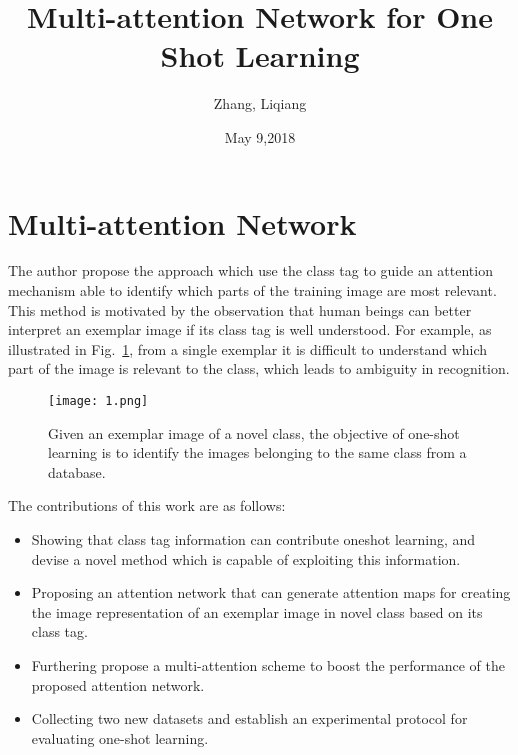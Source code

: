 \documentclass{article}
\author{Zhang, Liqiang}
\date{May 9,2018}
\title{Multi-attention Network for One Shot Learning}
\begin{document}
\maketitle
\par
\section{Multi-attention Network}
\par
The author propose the approach which use the class tag to guide an attention mechanism able to identify which parts of the training image are most relevant. This method is motivated by the observation that human beings can better interpret an exemplar image if its class tag is well understood. \cite{Cao2015Look}For example, as illustrated in Fig.~\ref{1}, from a single exemplar it is difficult to understand which part of the image is relevant to the class, which leads to ambiguity in recognition.
\begin{figure}[H]
  \centering
  \texttt{[image: 1.png]}\\
  \caption{Given an exemplar image of a novel class, the objective of one-shot learning is to identify the images belonging to the same class from a database. }\label{1}
\end{figure}
The contributions of this work are as follows:
\begin{itemize}
\item{Showing that class tag information can contribute oneshot learning, and devise a novel method which is capable of exploiting this information.}
\item{Proposing an attention network that can generate attention maps for creating the image representation of an exemplar image in novel class based on its class tag.}
\item{Furthering propose a multi-attention scheme to boost the performance of the proposed attention network.}
\item{Collecting two new datasets and establish an experimental protocol for evaluating one-shot learning.}
\end{itemize}
\par
\end{document}
